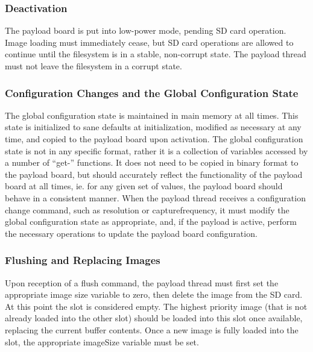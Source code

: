 \documentclass{article}
\begin{document}
\subsubsection{Deactivation}
The payload board is put into low-power mode, pending SD card operation. 
Image loading must immediately cease, but SD card operations are allowed to
continue until the filesystem is in a stable, non-corrupt state. The
payload thread must not leave the filesystem in a corrupt state.

\subsubsection{Configuration Changes and the Global Configuration State}
The global configuration state is maintained in main memory at all times. 
This state is initialized to sane
defaults at initialization, modified as necessary at any time, and copied
to the payload board upon activation. 
The global configuration state is not in any specific format, rather it is
a collection of variables accessed by a number of ``get-'' functions. It does
not need to be copied in binary format to the payload board, but should
accurately reflect the functionality of the payload board at all times, ie. for
any given set of values, the payload board should behave in a consistent manner.
When the payload thread receives a configuration change command, such as resolution
or capturefrequency, it must modify the global configuration state as
appropriate, and, if the payload is active, perform the necessary operations
to update the payload board configuration.

\subsubsection{Flushing and Replacing Images}
Upon reception of a flush command, the payload thread must first set the
appropriate image size variable to zero, then delete the image
from the SD card. At this point the slot is
considered empty. The highest priority image (that is not already loaded into
the other slot) should be loaded into this slot
once available, replacing the current buffer contents. Once a new image is fully
loaded into the slot, the appropriate imageSize variable must be set.
\end{document}
